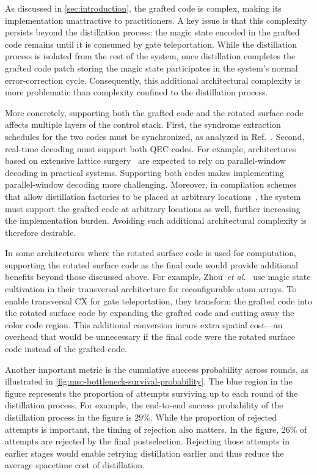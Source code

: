 As discussed in \autoref{sec:introduction}, the grafted code is complex, making its implementation unattractive to practitioners.
A key issue is that this complexity persists beyond the distillation process: the magic state encoded in the grafted code remains until it is consumed by gate teleportation.
While the distillation process is isolated from the rest of the system, once distillation completes the grafted code patch storing the magic state participates in the system's normal error-correction cycle.
Consequently, this additional architectural complexity is more problematic than complexity confined to the distillation process.

More concretely, supporting both the grafted code and the rotated surface code affects multiple layers of the control stack.
First, the syndrome extraction schedules for the two codes must be synchronized, as analyzed in Ref.~\cite{maurya2025synchronization}.
Second, real-time decoding must support both QEC codes.
For example, architectures based on extensive lattice surgery~\cite{Litinski2019GameOfSurfaceCodes} are expected to rely on parallel-window decoding in practical systems.
Supporting both codes makes implementing parallel-window decoding more challenging.
Moreover, in compilation schemes that allow distillation factories to be placed at arbitrary locations~\cite{hirano2025locality}, the system must support the grafted code at arbitrary locations as well, further increasing the implementation burden.
Avoiding such additional architectural complexity is therefore desirable.

In some architectures where the rotated surface code is used for computation, supporting the rotated surface code as the final code would provide additional benefits beyond those discussed above.
For example, Zhou~\textit{et al.}~\cite{zhou2025resource} use magic state cultivation in their transversal architecture for reconfigurable atom arrays.
To enable transversal CX for gate teleportation, they transform the grafted code into the rotated surface code by expanding the grafted code and cutting away the color code region.
This additional conversion incurs extra spatial cost---an overhead that would be unnecessary if the final code were the rotated surface code instead of the grafted code.

Another important metric is the cumulative success probability across rounds, as illustrated in \autoref{fig:msc-bottleneck-survival-probability}.
The blue region in the figure represents the proportion of attempts surviving up to each round of the distillation process.
For example, the end-to-end success probability of the distillation process in the figure is 29\%.
While the proportion of rejected attempts is important, the timing of rejection also matters.
In the figure, 26\% of attempts are rejected by the final postselection.
Rejecting those attempts in earlier stages would enable retrying distillation earlier and thus reduce the average spacetime cost of distillation.

